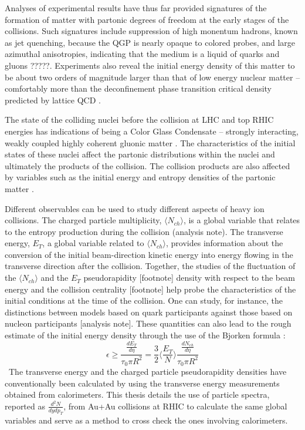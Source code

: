 Analyses of experimental results have thus far provided signatures of the formation of matter with partonic degrees of freedom at the early stages of the collisions. Such signatures include suppression of high monentum hadrons, known as jet quenching, because the QGP is nearly opaque to colored probes, and large azimuthal anisotropies, indicating that the medium is a liquid of quarks and gluons \cite{PhysRevC.96.044904}?????. Experiments also reveal the initial energy density of this matter to be about two orders of magnitude larger than that of low energy nuclear matter -- comfortably more than the deconfinement phase transition critical density predicted by lattice QCD \cite{2005PrPNP..54..443J}.

The state of the colliding nuclei before the collision at LHC and top RHIC energies has indications of being a Color Glass Condensate -- strongly interacting, weakly coupled highly coherent gluonic matter \cite{1742-6596-458-1-012024}. The characteristics of the initial states of these nuclei affect the partonic distributions within the nuclei and ultimately the products of the collision. The collision products are also affected by variables such as the initial energy and entropy densities of the partonic matter \cite{2005PrPNP..54..443J}.

Different observables can be used to study different aspects of heavy ion collisions. The charged particle multiplicity, $\langle N_{ch} \rangle$, is a global variable that relates to the entropy production during the collision (analysis note). The transverse energy, $E_{T}$, a global variable related to $\langle N_{ch} \rangle$, provides information about the conversion of the initial beam-direction kinetic energy into energy flowing in the transverse direction after the collision. Together, the studies of the fluctuation of the $\langle N_{ch} \rangle$ and the $E_{T}$ pseudorapidity [footnote] density with respect to the beam energy and the collision centrality [footnote] help probe the characteristics of the initial conditions at the time of the collision. One can study, for instance, the distinctions between models based on quark participants against those based on nucleon participants [analysis note]. These quantities can also lead to the rough estimate of the initial energy density through the use of the Bjorken formula \cite{2012ARNPS..62..361M}:
\begin{equation}\label{eqn:Bjorken}
\epsilon \geq \frac{\frac{dE_{T}}{d\eta}}{\tau_{0}\pi R^{2}} = \frac{3}{2}\langle \frac{E_{T}}{N} \rangle \frac{\frac{dN_{ch}}{d\eta}}{\tau_{0}\pi R^{2}}
\end{equation}
\
The transverse energy and the charged particle pseudorapidity densities have conventionally been calculated by using the transverse energy measurements obtained from calorimeters. This thesis details the use of particle spectra, reported as $\frac{d^{2}N}{dydp_{T}}$, from Au+Au collisions at RHIC to calculate the same global variables and serve as a method to cross check the ones involving calorimeters.
